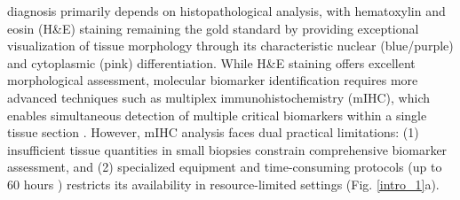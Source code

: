 \documentclass[journal,twoside,web]{ieeecolor}
\begin{document}
 diagnosis primarily depends on histopathological analysis, with hematoxylin and eosin (H\&E) staining remaining the gold standard by providing exceptional visualization of tissue morphology through its characteristic nuclear (blue/purple) and cytoplasmic (pink) differentiation\cite{irshad2014automated}.
While H\&E staining offers excellent morphological assessment, molecular biomarker identification requires more advanced techniques such as multiplex immunohistochemistry (mIHC), which enables simultaneous detection of multiple critical biomarkers within a single tissue section \cite{weitz2023multi}.
However, mIHC analysis faces dual practical limitations: (1) insufficient tissue quantities in small biopsies constrain comprehensive biomarker assessment, and (2) specialized equipment and time-consuming protocols (up to 60 hours \cite{harms2023multiplex}) restricts its availability in resource-limited settings (Fig. \ref{intro_1}a).



\end{document}
